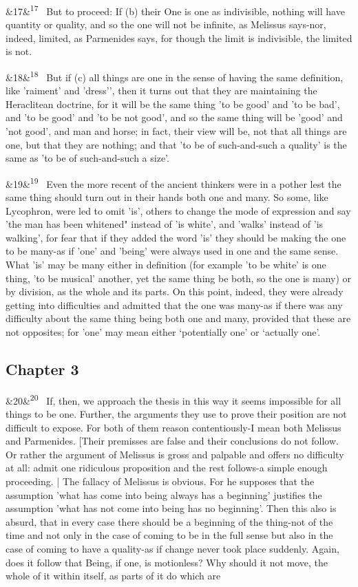 \documentclass[12pt]{article}
\newcommand{\para}[1][]{\par\noindent\ifx&#1&\else\textsuperscript{\footnotesize #1}~\fi}
\begin{document}
\para[17] But to proceed: If (b) their One is one as indivisible, nothing will have quantity or quality, and so the one will not be infinite, as Melissus says-nor, indeed, limited, as Parmenides says, for though the limit is indivisible, the limited is not.

\para[18] But if (c) all things are one in the sense of having the same definition, like 'raiment' and 'dress'’, then it turns out that they are maintaining the Heraclitean doctrine, for it will be the same thing 'to be good' and 'to be bad', and 'to be good' and 'to be not good', and so the same thing will be 'good' and 'not good', and man and horse; in fact, their view will be, not that all things are one, but that they are nothing; and that 'to be of such-and-such a quality’ is the same as 'to be of such-and-such a size’.

\para[19] Even the more recent of the ancient thinkers were in a pother lest the same thing should turn out in their hands both one and many. So some, like Lycophron, were led to omit 'is', others to change the mode of expression and say 'the man has been whitened" instead of 'is white', and 'walks' instead of 'is walking', for fear that if they added the word 'is' they should be making the one to be many-as if 'one' and 'being' were always used in one and the same sense. What 'is' may be many either in definition (for example 'to be white' is one thing, 'to be musical’ another, yet the same thing be both, so the one is many) or by division, as the whole and its parts. On this point, indeed, they were already getting into difficulties and admitted that the one was many-as if there was any difficulty about the same thing being both one and many, provided that these are not opposites; for 'one' may mean either ‘potentially one' or ‘actually one’.

\subsection*{Chapter 3}

\para[20] If, then, we approach the thesis in this way it seems impossible for all things to be one. Further, the arguments they use to prove their position are not difficult to expose. For both of them reason contentiously-I mean both Melissus and Parmenides. [Their premisses are false and their conclusions do not follow. Or rather the argument of Melissus is gross and palpable and offers no difficulty at all: admit one ridiculous proposition and the rest follows-a simple enough proceeding. | The fallacy of Melissus is obvious. For he supposes that the assumption 'what has come into being always has a beginning' justifies the assumption 'what has not come into being has no beginning’. Then this also is absurd, that in every case there should be a beginning of the thing-not of the time and not only in the case of coming to be in the full sense but also in the case of coming to have a quality-as if change never took place suddenly. Again, does it follow that Being, if one, is motionless? Why should it not move, the whole of it within itself, as parts of it do which are
\end{document}
